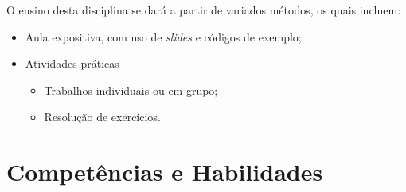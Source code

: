 \documentclass[a4paper, 12pt]{article}
\begin{document}
O ensino desta disciplina se dará a partir de variados métodos, os quais incluem: 
\begin{itemize}
    \item Aula expositiva, com uso de \textit{slides} e códigos de exemplo;
    \item Atividades práticas
        \begin{itemize}
            \item Trabalhos individuais ou em grupo;
            \item Resolução de exercícios.
        \end{itemize}
\end{itemize}

\section{Competências e Habilidades}
\end{document}
